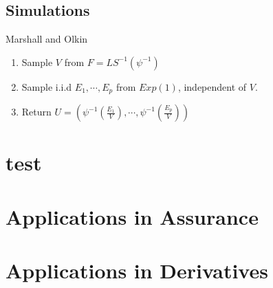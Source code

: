 \documentclass[12pt]{article}
\begin{document}
\subsection{Simulations}
\begin{algorithm}{Marshall and Olkin}{}
\begin{enumerate}
	\item Sample $V$ from $F = LS^{-1}(\psi^{-1})$
	\item Sample i.i.d $E_1,\cdots, E_p$ from $Exp(1)$, independent of $V$.
	\item Return $U = (\psi^{-1}(\frac{E_1}{V}),\cdots,\psi^{-1}(\frac{E_p}{V}))$
\end{enumerate} 
	
\end{algorithm}

%
%
\section{test}
\section{Applications in Assurance}
\section{Applications in Derivatives}
\end{document}
